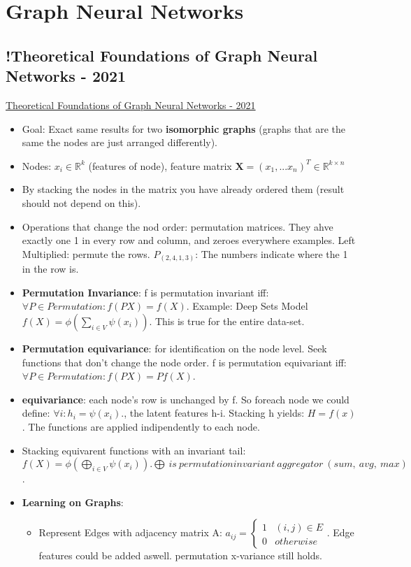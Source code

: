 \section{Graph Neural Networks}
\subsection{!Theoretical Foundations of Graph Neural Networks - 2021}
\href{https://www.youtube.com/watch?v=uF53xsT7mjc}{Theoretical Foundations of Graph Neural Networks - 2021}
\begin{itemize}[noitemsep,nolistsep]
	\item Goal: Exact same results for two \textbf{isomorphic graphs} (graphs that are the same the nodes are just arranged differently).
	\item Nodes: $x_i \in \mathbb{R}^k$ (features of node), feature matrix $\mathbf{X} = (x_1,...x_n)^T \in \mathbb{R}^{k \times n}$
	\item By stacking the nodes in the matrix you have already ordered them (result should not depend on this).
	\item Operations that change the nod order: permutation matrices. They ahve exactly one 1 in every row and column, and zeroes everywhere examples. Left Multiplied: permute the rows. $P_{(2,4,1,3)}$: The numbers indicate where the 1 in the row is.
	\item \textbf{Permutation Invariance}: f is permutation invariant iff: $\forall P \in Permutation: f(PX) = f(X)$. Example: Deep Sets Model $f(X) = \phi(\sum_{i \in V} \psi(x_i))$. This is true for the entire data-set.
	\item \textbf{Permutation equivariance}: for identification on the node level. Seek functions that don't change the node order. f is permutation equivariant iff: $\forall P \in Permutation: f(PX) = Pf(X)$.
	\item \textbf{equivariance}: each node's row is unchanged by f. So foreach node we could define: $\forall i: h_i = \psi(x_i).$, the latent features h-i. Stacking h yields: $H=f(x)$. The functions are applied indipendently to each node.
	\item Stacking equivarent functions with an invariant tail: $f(X) = \phi(\bigoplus_{i \in V}\psi(x_i)). \bigoplus\ is\ permutationinvariant\ aggregator\ (sum,\ avg,\ max)$.
	\item \textbf{Learning on Graphs}:
	\begin{itemize}[noitemsep,nolistsep]
		\item Represent Edges with adjacency matrix A: $a_{ij} = \begin{cases} 1& (i,j) \in E \\ 0 & otherwise \end{cases}$. Edge features could be added aswell. permutation x-variance still holds.

\end{itemize}
\end{itemize}
